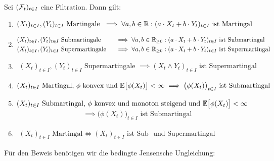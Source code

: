 \begin{proposition}\label{Prop2.1}\enter
Sei $(\mathcal{F}_t)_{t\in I}$ eine Filtration. Dann gilt:
\begin{enumerate}[label=\alph*)]
\item $\begin{aligned}
(X_t)_{t\in I},(Y_t)_{t\in I}\text{ Martingale }
\implies\forall a,b\in\mathbb{R}: (a\cdot X_t+b\cdot Y_t)_{t\in I}\text{ ist Martingal}
\end{aligned}$
\item $\begin{aligned}
		&(X_t)_{t\in I},(Y_t)_{t\in I}\text{ Submartingale }&
&\implies\forall a,b\in\mathbb{R}_{\geq0}: (a\cdot X_t+b\cdot Y_t)_{t\in I}\text{ ist Submartingal}\\
&(X_t)_{t\in I},(Y_t)_{t\in I}\text{ Supermartingale }&
&\implies\forall a,b\in\mathbb{R}_{\geq0}: (a\cdot X_t+b\cdot Y_t)_{t\in I}\text{ ist Supermartingal}
\end{aligned}$
\item $\begin{aligned}
(X_t)_{t\in I},(Y_t)_{t\in I}\text{ Supermartingale }
\implies (X_t\wedge Y_t)_{t\in I}\text{ ist Supermartingal}
\end{aligned}$
\item $\begin{aligned}
(X_t)_{t\in I}\text{ Martingal, $\phi$ konvex und }\mathbb{E}\big[\phi(X_t)\big]<\infty
\implies \big(\phi(X_t)\big)_{t\in I}\text{ ist Submartingal}
\end{aligned}$
\item $\begin{aligned}
(X_t)_{t\in I}\text{ Submartingal, $\phi$ konvex und monoton steigend und }\mathbb{E}\big[\phi(X_t)\big]<\infty
\end{aligned}$
\begin{align*}
\implies \big(\phi(X_t)\big)_{t\in I}\text{ ist Submartingal}
\end{align*}
\item $\begin{aligned}
(X_t)_{t\in I}\text{ Martingal}
\Longleftrightarrow
(X_t)_{t\in I}\text{ ist Sub- und Supermartingal}
\end{aligned}$
\end{enumerate}
\end{proposition}

Für den Beweis benötigen wir die bedingte Jensensche Ungleichung:

